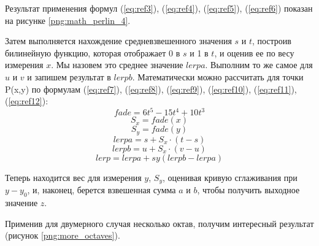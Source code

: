Результат применения формул (\ref{eq:ref3}), (\ref{eq:ref4}), (\ref{eq:ref5}), (\ref{eq:ref6}) показан на рисунке \ref{png:math_perlin_4}.
\begin{figure}[H]
\end{figure}

Затем выполняется нахождение средневзвешенного значения $s$ и $t$, построив билинейную функцию, которая отображает 0 в $s$ и 1 в $t$, и оценив ее по весу измерения $x$. Мы назовем это среднее значение $lerpa$. Выполним то же самое для $u$ и $v$ и запишем результат в $lerpb$. Математически можно рассчитать для точки P(x,y) по формулам (\ref{eq:ref7}), (\ref{eq:ref8}), (\ref{eq:ref9}), (\ref{eq:ref10}), (\ref{eq:ref11}), (\ref{eq:ref12}):
\begin{equation}
	fade = 6t^5 - 15t^4 + 10t^3
	\label{eq:ref7}
\end{equation}
\begin{equation}
	S_x = fade(x)
	\label{eq:ref8}
\end{equation}
\begin{equation}
	S_y = fade(y)
	\label{eq:ref9}
\end{equation}
\begin{equation}
	lerpa = s + S_{x} \cdot (t - s)
	\label{eq:ref10}
\end{equation}
\begin{equation}
	lerpb = u + S_x \cdot (v - u)
	\label{eq:ref11}
\end{equation}
\begin{equation}
	lerp = lerpa + sy(lerpb - lerpa)
	\label{eq:ref12}
\end{equation}

Теперь находится вес для измерения $y$, $S_y$, оценивая кривую сглаживания при $y - y_0$, и, наконец, берется взвешенная сумма $a$ и $b$, чтобы получить выходное значение $z$.

Применив для двумерного случая несколько октав, получим интересный результат (рисунок \ref{png:more_octaves}).
\begin{figure}[H]
	\captionsetup{justification=centering}
\end{figure}

